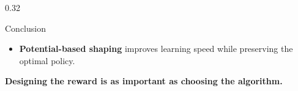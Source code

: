 \begin{frame}[t]
\begin{columns}[t]
\begin{column}{0.32\textwidth}
\begin{block}{Conclusion}
\begin{itemize}
					\item \textbf{Potential-based shaping} improves learning speed while preserving the optimal policy.

				\end{itemize}

				\medskip

				\begin{center}
					\textbf{Designing the reward is as important as choosing the algorithm.}
				\end{center}

			\end{block}
		\end{column}

	\end{columns}

\end{frame}


